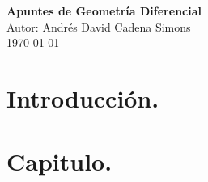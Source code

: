 \documentclass[a4paper,12pt]{book}
\begin{document}
\begin{titlepage}
    \centering
    {\Huge \textbf{Apuntes de Geometría Diferencial}}\\[2cm]
    {\Large Autor: Andrés David Cadena Simons}\\[1cm]
    {\Large \today}
\end{titlepage}

\chapter*{Introducción.}


\tableofcontents

\chapter{Capitulo.}



  
\end{document}
